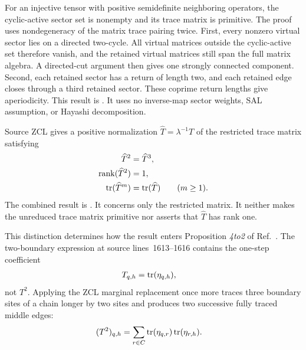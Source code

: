 \documentclass{article}
\begin{document}
For an injective tensor with positive semidefinite neighboring operators, the
cyclic-active sector set is nonempty and its trace matrix is primitive. The
proof uses nondegeneracy of the matrix trace pairing twice. First, every
nonzero virtual sector lies on a directed two-cycle. All virtual matrices
outside the cyclic-active set therefore vanish, and the retained virtual
matrices still span the full matrix algebra. A directed-cut argument then
gives one strongly connected component. Second, each retained sector has a
return of length two, and each retained edge closes through a third retained
sector. These coprime return lengths give aperiodicity. This result is
. It uses no inverse-map sector
weights, SAL assumption, or Hayashi decomposition.

Source ZCL gives a positive normalization
$\widehat T=\lambda^{-1}T$ of the restricted trace matrix satisfying
\begin{align}
    \widehat T^2
        &=\widehat T^3,
    \label{eq:cpsv16_commuting_form_to_sal_normalized_trace_square_cube}\\
    \operatorname{rank}(\widehat T^2)
        &=1,
    \label{eq:cpsv16_commuting_form_to_sal_normalized_trace_square_rank}\\
    \operatorname{tr}(\widehat T^m)
        &=\operatorname{tr}(\widehat T)
        \qquad(m\geq1).
    \label{eq:cpsv16_commuting_form_to_sal_normalized_trace_power_traces}
\end{align}
The combined result is
.
It concerns only the restricted matrix. It neither makes the unreduced trace
matrix primitive nor asserts that $\widehat T$ has rank one.

This distinction determines how the result enters Proposition \emph{4to2} of
Ref.~\cite{Cirac2016MPDO_arXiv}. The two-boundary expression at source
lines~1613--1616 contains the one-step coefficient
\begin{align}
    T_{q,h}
        &=\operatorname{tr}(\eta_{q,h}),
    \label{eq:cpsv16_commuting_form_to_sal_one_step_trace_coefficient}
\end{align}
not $T^2$. Applying the ZCL marginal replacement once more traces three
boundary sites of a chain longer by two sites and produces two successive
fully traced middle edges:
\begin{align}
    (T^2)_{q,h}
        &=
        \sum_{r\in C}
        \operatorname{tr}(\eta_{q,r})\operatorname{tr}(\eta_{r,h}).
    \label{eq:cpsv16_commuting_form_to_sal_two_step_trace_coefficient}
\end{align}
\end{document}
